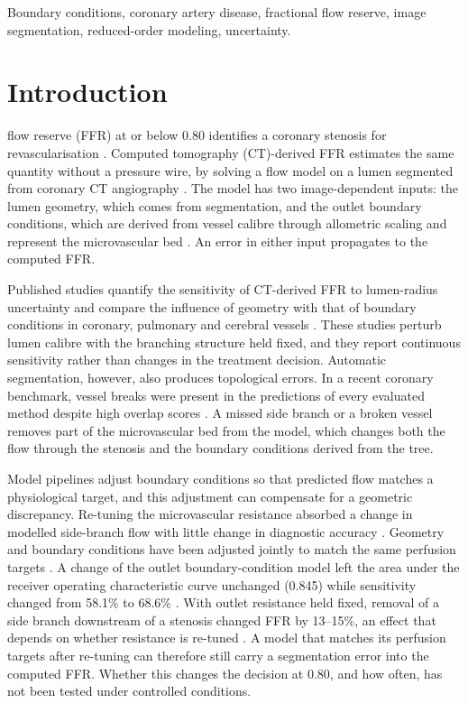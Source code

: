 \documentclass[journal]{IEEEtran}
\begin{document}
\begin{IEEEkeywords}
Boundary conditions, coronary artery disease, fractional flow reserve, image segmentation, reduced-order modeling,
uncertainty.
\end{IEEEkeywords}

\section{Introduction}
 flow reserve (FFR) at or below 0.80 identifies a coronary stenosis for revascularisation
\cite{tonino2009}. Computed tomography (CT)-derived FFR estimates the same quantity without a pressure wire, by
solving a flow model on a lumen segmented from coronary CT angiography \cite{taylor2013,norgaard2014,itu2016}. The
model has two image-dependent inputs: the lumen geometry, which comes from segmentation, and the outlet boundary
conditions, which are derived from vessel calibre through allometric scaling and represent the microvascular bed
\cite{kim2010,murray1926}. An error in either input propagates to the computed FFR.

Published studies quantify the sensitivity of CT-derived FFR to lumen-radius uncertainty
\cite{sankaran2015tmi,sankaran2015cmame,fernandez2024} and compare the influence of geometry with that of boundary
conditions in coronary, pulmonary and cerebral vessels \cite{sankaran2016,tanade2022,colebank2019,korte2023}. These
studies perturb lumen calibre with the branching structure held fixed, and they report continuous sensitivity rather
than changes in the treatment decision. Automatic segmentation, however, also produces topological errors. In a
recent coronary benchmark, vessel breaks were present in the predictions of every evaluated method despite high
overlap scores \cite{bransby2026}. A missed side branch or a broken vessel removes part of the microvascular bed from
the model, which changes both the flow through the stenosis and the boundary conditions derived from the tree.

Model pipelines adjust boundary conditions so that predicted flow matches a physiological target, and this
adjustment can compensate for a geometric discrepancy. Re-tuning the microvascular resistance absorbed a change in
modelled side-branch flow with little change in diagnostic accuracy \cite{gosling2020}. Geometry and boundary
conditions have been adjusted jointly to match the same perfusion targets \cite{menon2024}. A change of the outlet
boundary-condition model left the area under the receiver operating characteristic curve unchanged (0.845) while
sensitivity changed from 58.1\% to 68.6\% \cite{fossan2026}. With outlet resistance held fixed, removal of a side
branch downstream of a stenosis changed FFR by 13--15\%, an effect that depends on whether resistance is re-tuned
\cite{gamage2022}. A model that matches its perfusion targets after re-tuning can therefore still carry a
segmentation error into the computed FFR. Whether this changes the decision at 0.80, and how often, has not been
tested under controlled conditions.
\end{document}
